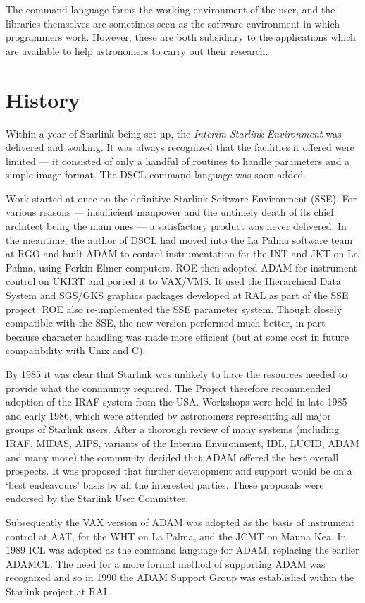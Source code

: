 The command language forms the working environment of the user, and the
libraries themselves are sometimes seen as the software environment in which
programmers work.
However, these are both subsidiary to the applications which are available to
help astronomers to carry out their research.

\section*{History}
\label{S_histadam}

Within a year of Starlink being set up, the {\em Interim Starlink Environment}
was delivered and working.
It was always recognized that the facilities it offered were limited --- it
consisted of only a handful of routines to handle parameters and a simple
image format.
The DSCL command language was soon added.

Work started at once on the definitive Starlink Software Environment (SSE).
For various reasons --- insufficient manpower and the untimely death of its
chief architect being the main ones --- a satisfactory product was never
delivered.
In the meantime, the author of DSCL had moved into the La Palma software team
at RGO and built ADAM to control instrumentation for the INT and JKT on
La Palma, using Perkin-Elmer computers.
ROE then adopted ADAM for instrument control on UKIRT and ported it to VAX/VMS.
It used the Hierarchical Data System and SGS/GKS graphics packages developed
at RAL as part of the SSE project.
ROE also re-implemented the SSE parameter system.
Though closely compatible with the SSE, the new version performed much better,
in part because character handling was made more efficient (but at some cost in
future compatibility with Unix and C).

By 1985 it was clear that Starlink was unlikely to have the resources needed
to provide what the community required.
The Project therefore recommended adoption of the IRAF system from the USA.
Workshops were held in late 1985 and early 1986, which were attended by
astronomers representing all major groups of Starlink users.
After a thorough review of many systems (including IRAF, MIDAS, AIPS, variants
of the Interim Environment, IDL, LUCID, ADAM and many more) the community
decided that ADAM offered the best overall prospects.
It was proposed that further development and support would be on a `best
endeavours' basis by all the interested parties.
These proposals were endorsed by the Starlink User Committee.

Subsequently the VAX version of ADAM was adopted as the basis of instrument
control at AAT, for the WHT on La Palma, and the JCMT on Mauna Kea.
In 1989 ICL was adopted as the command language for ADAM, replacing the
earlier ADAMCL.
The need for a more formal method of supporting ADAM was recognized and so in
1990 the ADAM Support Group was established within the Starlink project at RAL.

